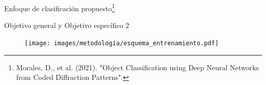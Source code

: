 \documentclass[aspectratio=169,t,xcolor=table]{beamer}
\begin{document}
\begin{frame}{Enfoque de clasificación propuesto\footnote{\tiny Morales, D., et al. (2021). "Object Classification using Deep Neural Networks from Coded Diffraction Patterns".}}
\scriptsize
\begin{block}{ {\small Objetivo general y Objetivo específico 2} \checkmark}
\begin{figure}
    \centering
    \texttt{[image: images/metodología/esquema\_entrenamiento.pdf]}
\end{figure}
\vspace{-0.2cm}

\end{block}


    
    

\end{frame}
\end{document}
